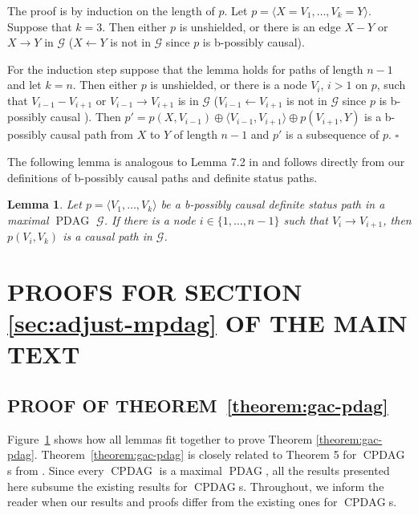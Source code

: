 \documentclass[letterpaper]{article}
\newtheorem{lemma}[theorem]{Lemma}
\theoremstyle{definition}
\newenvironment{proofof}[1][]{\begin{trivlist}
   \item[\hskip \labelsep {\bfseries Proof of #1.}]}{\hfill{}$\square$\end{trivlist}}
\theoremstyle{remark}
\DeclareMathOperator{\PDAG}{PDAG}
\DeclareMathOperator{\CPDAG}{CPDAG}
\newcommand{\mpdag}{maximal $\PDAG$}
\newcommand{\g}[1][G]{\mathcal{#1}}
\begin{document}
\begin{proofof}[Lemma~\ref{lemma:unshielded-analog}] The proof is by induction on the length of $p$. Let $p=\langle X= V_1, \dots , V_k =Y \rangle$.
Suppose that $k=3$. Then either $p$ is unshielded, or there is an edge  $X - Y$ or $X \rightarrow Y$ in $\g$ ($X \leftarrow Y$ is not in $\g$ since $p$ is b-possibly causal). 

For the induction step suppose that the lemma holds for paths of length $n-1$ and let $k=n$. Then either $p$ is unshielded, or there is a node $V_i$, $i >1$ on $p$, such that $V_{i-1} - V_{i+1}$ or $V_{i-1} \rightarrow V_{i+1}$ is in $\g$ ($V_{i-1} \leftarrow V_{i+1}$ is not in $\g$ since $p$ is b-possibly causal ). Then $p' = p(X,V_{i-1}) \oplus \langle V_{i-1}, V_{i+1} \rangle \oplus p(V_{i+1},Y)$ is a b-possibly causal path from $X$ to $Y$ of length $n-1$ and $p'$ is a subsequence of $p$.  
\end{proofof}
The following lemma is analogous to Lemma 7.2 in \cite{maathuis2013generalized} and follows directly from our definitions of b-possibly causal paths and definite status paths.
\begin{lemma}
 Let $p =\langle V_1, \dots , V_k \rangle$ be a b-possibly causal definite status path in a \mpdag{} $\g$. If there is a node $i \in \{1, \dots, n-1\}$ such that $V_i \rightarrow V_{i+1}$, then $p(V_i, V_k)$ is a causal path in $\g$.
\label{lemma:unshielded-edgeanalog}
\end{lemma}

\section{PROOFS FOR SECTION \ref{sec:adjust-mpdag} OF THE MAIN TEXT} \label{sec:proofadjust-mpdag}

\subsection{PROOF OF THEOREM~\ref{theorem:gac-pdag}}

\begin{figure}[omitted: a diagram of this paper's results, not reproduced here]\label{figproof}\end{figure}

Figure~\ref{figproof} shows how all lemmas fit together to prove Theorem \ref{theorem:gac-pdag}. Theorem~\ref{theorem:gac-pdag} is closely related to Theorem 5 for $\CPDAG$s from \cite{perkovic16}. Since every $\CPDAG$ is a \mpdag{}, all the results presented here subsume the existing  results for $\CPDAG$s. Throughout, we inform the reader when our results and proofs differ from the existing ones for $\CPDAG$s.
\end{document}
